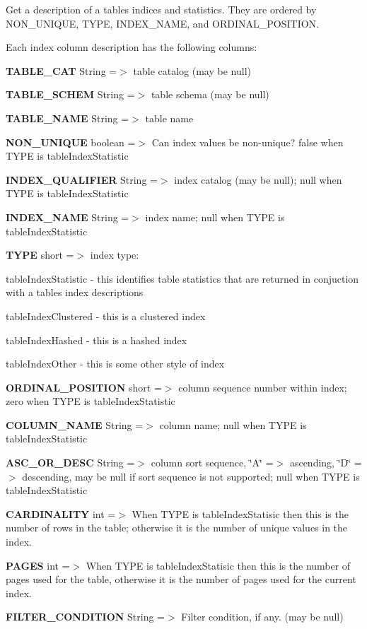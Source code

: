 Get a description of a table\textquotesingle{}s indices and statistics. They are ordered by N\+O\+N\+\_\+\+U\+N\+I\+Q\+UE, T\+Y\+PE, I\+N\+D\+E\+X\+\_\+\+N\+A\+ME, and O\+R\+D\+I\+N\+A\+L\+\_\+\+P\+O\+S\+I\+T\+I\+ON. 

Each index column description has the following columns\+: 
\begin{DoxyEnumerate}
\item {\bfseries T\+A\+B\+L\+E\+\_\+\+C\+AT} String =$>$ table catalog (may be null) 
\item {\bfseries T\+A\+B\+L\+E\+\_\+\+S\+C\+H\+EM} String =$>$ table schema (may be null) 
\item {\bfseries T\+A\+B\+L\+E\+\_\+\+N\+A\+ME} String =$>$ table name 
\item {\bfseries N\+O\+N\+\_\+\+U\+N\+I\+Q\+UE} boolean =$>$ Can index values be non-\/unique? false when T\+Y\+PE is table\+Index\+Statistic 
\item {\bfseries I\+N\+D\+E\+X\+\_\+\+Q\+U\+A\+L\+I\+F\+I\+ER} String =$>$ index catalog (may be null); null when T\+Y\+PE is table\+Index\+Statistic 
\item {\bfseries I\+N\+D\+E\+X\+\_\+\+N\+A\+ME} String =$>$ index name; null when T\+Y\+PE is table\+Index\+Statistic 
\item {\bfseries T\+Y\+PE} short =$>$ index type\+: 
\begin{DoxyItemize}
\item table\+Index\+Statistic -\/ this identifies table statistics that are returned in conjuction with a table\textquotesingle{}s index descriptions 
\item table\+Index\+Clustered -\/ this is a clustered index 
\item table\+Index\+Hashed -\/ this is a hashed index 
\item table\+Index\+Other -\/ this is some other style of index 
\end{DoxyItemize}
\item {\bfseries O\+R\+D\+I\+N\+A\+L\+\_\+\+P\+O\+S\+I\+T\+I\+ON} short =$>$ column sequence number within index; zero when T\+Y\+PE is table\+Index\+Statistic 
\item {\bfseries C\+O\+L\+U\+M\+N\+\_\+\+N\+A\+ME} String =$>$ column name; null when T\+Y\+PE is table\+Index\+Statistic 
\item {\bfseries A\+S\+C\+\_\+\+O\+R\+\_\+\+D\+E\+SC} String =$>$ column sort sequence, \char`\"{}\+A\char`\"{} =$>$ ascending, \char`\"{}\+D\char`\"{} =$>$ descending, may be null if sort sequence is not supported; null when T\+Y\+PE is table\+Index\+Statistic 
\item {\bfseries C\+A\+R\+D\+I\+N\+A\+L\+I\+TY} int =$>$ When T\+Y\+PE is table\+Index\+Statisic then this is the number of rows in the table; otherwise it is the number of unique values in the index. 
\item {\bfseries P\+A\+G\+ES} int =$>$ When T\+Y\+PE is table\+Index\+Statisic then this is the number of pages used for the table, otherwise it is the number of pages used for the current index. 
\item {\bfseries F\+I\+L\+T\+E\+R\+\_\+\+C\+O\+N\+D\+I\+T\+I\+ON} String =$>$ Filter condition, if any. (may be null) 
\end{DoxyEnumerate}


